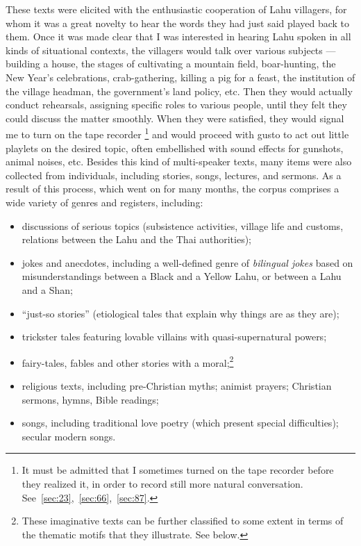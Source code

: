 These texts were elicited with the enthusiastic cooperation of Lahu
villagers, for whom it was a great novelty to hear the words they had
just said played back to them. Once it was made clear that I was
interested in hearing Lahu spoken in all kinds of situational
contexts, the villagers would talk over various subjects --- building a
house, the stages of cultivating a mountain field, boar-hunting, the
New Year's celebrations, crab-gathering, killing a pig for a feast,
the institution of the village headman, the government's land
policy, etc. Then they would actually conduct rehearsals, assigning
specific roles to various people, until they felt they could discuss
the matter smoothly.  When they were satisfied, they would signal me
to turn on the tape recorder \footnote{It must be admitted that I
  sometimes turned on the tape recorder before they realized it, in
  order to record still more natural
  conversation. See~\ref{sec:23},~\ref{sec:66},~\ref{sec:87}.} and
would proceed with gusto to act out little playlets on the desired
topic, often embellished with sound effects for gunshots, animal
noises, etc. Besides this kind of multi-speaker texts, many items were
also collected from individuals, including stories, songs, lectures,
and sermons. As a result of this process, which went on for many
months, the corpus comprises a wide variety of genres and registers,
including:

\begin{itemize}
\item discussions of serious topics (subsistence activities, village
life and customs, relations between the Lahu and the Thai authorities);

\item jokes and anecdotes, including a well-defined genre of
\emph{bilingual jokes} based on misunderstandings between a Black and a
Yellow Lahu, or between a Lahu and a Shan;
\item ``just-so stories'' (etiological tales that explain why things are as they are);
\item trickster tales featuring lovable villains with
  quasi-supernatural powers;
\item fairy-tales, fables and other
stories with a moral;\footnote{These imaginative texts
  can be further classified to some extent in terms of the thematic
  motifs that they illustrate. See below.}

\item religious texts, including pre-Christian myths; animist prayers;
Christian sermons, hymns, Bible readings;

\item songs, including traditional love poetry (which present special
difficulties); secular modern songs.
\end{itemize}

